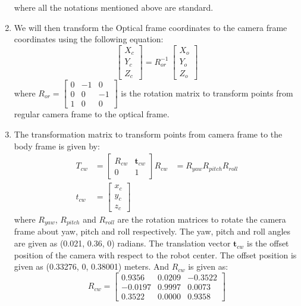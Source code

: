 \documentclass[a4paper]{article}
\begin{document}
\begin{enumerate}
\begin{equation}
    \end{equation}
    where all the notations mentioned above are standard.
    \item We will then transform the Optical frame coordinates to the camera frame coordinates using the following equation:
    \begin{equation}
        \begin{bmatrix} X_c \\ Y_c \\ Z_c \end{bmatrix} = R_{or}^{-1} \ \begin{bmatrix} X_o \\ Y_o \\ Z_o \end{bmatrix}
    \end{equation}
    where $R_{or} = \begin{bmatrix} 0 & -1 & 0 \\ 0 & 0 & -1 \\ 1 & 0 & 0 \end{bmatrix}$ is the rotation matrix to transform points from regular camera frame to the optical frame.
    \item The transformation matrix to transform points from camera frame to the body frame is given by:
    \begin{equation}
        \begin{aligned}
        T_{cw} &= \begin{bmatrix} R_{cw} & \mathbf{t}_{cw} \\ 0 & 1 \end{bmatrix}
        R_{cw} &= R_{yaw}R_{pitch}R_{roll} \\
        t_{cw} &= \begin{bmatrix} x_c \\ y_c \\ z_c \end{bmatrix}
        \end{aligned}
    \end{equation}
    where $R_{yaw}$, $R_{pitch}$ and $R_{roll}$ are the rotation matrices to rotate the camera frame about yaw, pitch and roll respectively. The yaw, pitch and roll angles are given as (0.021, 0.36, 0) radians. The translation vector $\mathbf{t}_{cw}$ is the offset position of the camera with respect to the robot center. The offset position is given as (0.33276, 0, 0.38001) meters. And $R_{cw}$ is given as:
    \begin{equation}
        R_{cw} = \begin{bmatrix} 0.9356 & 0.0209 & -0.3522 \\ -0.0197 & 0.9997 & 0.0073 \\ 0.3522 & 0.0000 & 0.9358 \end{bmatrix}

\end{equation}
\end{enumerate}
\end{document}
